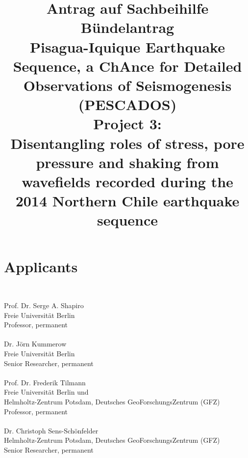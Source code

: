 \documentclass[11pt]{article}
\title{Antrag auf Sachbeihilfe \\[\baselineskip]
Bündelantrag \\
{\LARGE \textbf{P}isagua-Iquique \textbf{E}arthquake \textbf{S}equence, a \textbf{C}h\textbf{A}nce for \textbf{D}etailed \textbf{O}bservations of \textbf{S}eismogenesis
(PESCADOS)} \\[\baselineskip]
{\bfseries Project 3: \\
Disentangling roles of stress, pore pressure and shaking from wavefields recorded during the 2014 Northern Chile earthquake sequence
}}
\date{} %
\providecommand{\currfilename}{}
\newcommand{\showfile}{{\bf \tt \color{blue} \currfilename}}
\newcommand{\note}[1]{{\it \color{red} #1}}
\newcommand{\note}[1]{}
\newcommand{\showfile}{}
\begin{document}
\maketitle

\section*{Applicants}

\showfile

\noindent Prof. Dr. Serge A. Shapiro\\
Freie Universit\"at Berlin\\
Professor, permanent\\
\\
\noindent Dr. J\"orn Kummerow\\
Freie Universit\"at Berlin\\
Senior Researcher, permanent\\
\\%
\noindent Prof. Dr. Frederik Tilmann\\
Freie Universität Berlin und \\
Helmholtz-Zentrum Potsdam, Deutsches GeoForschungsZentrum (GFZ)\\
Professor, permanent\\
\\
\noindent Dr. Christoph Sens-Schönfelder\\
Helmholtz-Zentrum Potsdam, Deutsches GeoForschungsZentrum (GFZ)\\
Senior Researcher, permanent\\




\end{document}
